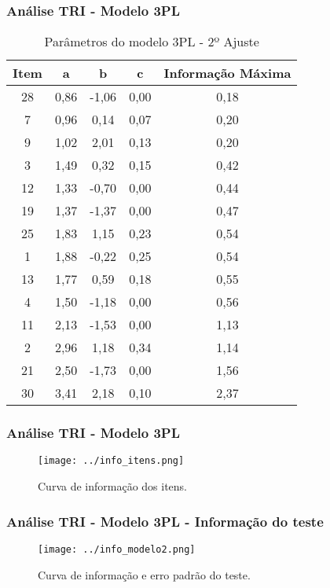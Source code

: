 \documentclass{beamer}
\begin{document}
\begin{frame}
	\frametitle{Análise TRI - Modelo 3PL}
	
	\begin{table}[ht]
		\centering
			\caption{Parâmetros do modelo 3PL - 2º Ajuste}
		\scriptsize %
		\begin{tabular}{ccccc}
			\hline
			\textbf{Item} & \textbf{a} & \textbf{b} & \textbf{c} & \textbf{Informação Máxima} \\ 
			\hline 
			28 & 0,86 & -1,06 & 0,00 & 0,18 \\ 
			7  & 0,96 & 0,14 & 0,07 & 0,20 \\ 
			9  & 1,02 & 2,01 & 0,13 & 0,20 \\ 
			3  & 1,49 & 0,32 & 0,15 & 0,42 \\ 
			12 & 1,33 & -0,70 & 0,00 & 0,44 \\ 
			19 & 1,37 & -1,37 & 0,00 & 0,47 \\ 
			25 & 1,83 & 1,15 & 0,23 & 0,54 \\ 
			1  & 1,88 & -0,22 & 0,25 & 0,54 \\ 
			13 & 1,77 & 0,59 & 0,18 & 0,55 \\ 
			4  & 1,50 & -1,18 & 0,00 & 0,56 \\ 
			11 & 2,13 & -1,53 & 0,00 & 1,13 \\ 
			2  & 2,96 & 1,18 & 0,34 & 1,14 \\ 
			21 & 2,50 & -1,73 & 0,00 & 1,56 \\ 
			30 & 3,41 & 2,18 & 0,10 & 2,37 \\ 
			\hline
		\end{tabular}%
	\end{table}
	
\end{frame}

	
	\begin{frame}
		
		\frametitle{Análise TRI - Modelo 3PL}
		\begin{figure}
				\caption{Curva de informação dos itens.}
				\texttt{[image: ../info\_itens.png]}
		\end{figure}
	
	\end{frame}	
	
	\begin{frame}
		
		\frametitle{Análise TRI - Modelo 3PL - Informação do teste}
		\begin{figure}
			\caption{Curva de informação e erro padrão do teste.}
	  	    \texttt{[image: ../info\_modelo2.png]}
		\end{figure}
		
	\end{frame}	
	
\end{document}
